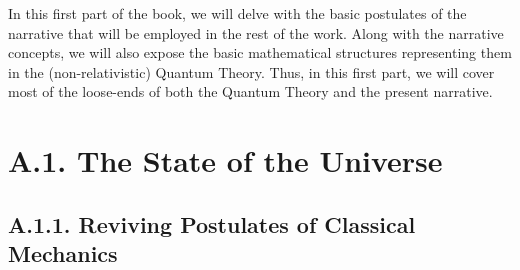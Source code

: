 \documentclass[11pt, a4paper]{article} %
\begin{document}
In this first part of the book, we will delve with the basic postulates of the narrative that will be employed in the rest of the work. Along with the narrative concepts, we will also expose the basic mathematical structures representing them in the (non-relativistic) Quantum Theory. Thus, in this first part, we will cover most of the loose-ends of both the Quantum Theory and the present narrative.

\newpage



\section*{A.1. The State of the Universe}\vspace{-0.2cm}

\subsection*{A.1.1. Reviving Postulates of Classical Mechanics}\vspace{-0.2cm}
\end{document}

